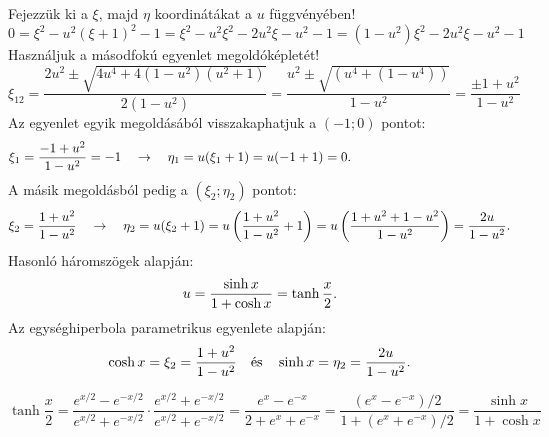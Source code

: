 \documentclass[a4paper, 12pt]{scrartcl}
\begin{document}
\begin{learnMore}
  Fejezzük ki a $\xi$, majd $\eta$ koordinátákat a $u$ függvényében!
  \[
    0
    = \xi^2 - u^2(\xi + 1)^2 - 1
    = \xi^2 - u^2\xi^2 - 2u^2\xi - u^2 - 1
    = (1 - u^2)\xi^2 - 2u^2\xi - u^2 - 1
  \]
  Használjuk a másodfokú egyenlet megoldóképletét!
  \[
    \xi_{12} = \frac{
      2u^2 \pm \sqrt{4u^4 + 4(1 - u^2)(u^2 + 1)}
    }{
      2(1 - u^2)
    } = \frac{
      u^2 \pm \sqrt{(u^4 + (1 - u^4))}
    }{
      1 - u^2
    } = \frac{
      \pm 1 + u^2
    }{
      1 - u^2
    }
  \]
  Az egyenlet egyik megoldásából visszakaphatjuk a $(-1;0)$ pontot:
  \[
    \xi_1 = \frac{-1 + u^2}{1 - u^2} = -1
    \quad \rightarrow \quad
    \eta_1 = u(\xi_1 + 1) = u(-1 + 1) = 0
    \text.
    \hspace{43mm}
  \]
  A másik megoldásból pedig a $(\xi_2; \eta_2)$ pontot:
  \[
    \xi_2 = \frac{1 + u^2}{1 - u^2}
    \quad \rightarrow \quad
    \eta_2 = u(\xi_2 + 1) = u\left(
    \frac{1 + u^2}{1 - u^2} + 1
    \right) = u\left(
    \frac{1 + u^2 + 1 - u^2}{1 - u^2}
    \right) = \frac{2u}{1 - u^2}
    \text.
  \]
  Hasonló háromszögek alapján:
  \[
    u
    = \frac{\sinh x}{1 + \cosh x}
    = \tanh \frac{x}{2}
    \text.
  \]
  Az egységhiperbola parametrikus egyenlete alapján:
  \[
    \cosh x = \xi_2 = \frac{1 + u^2}{1 - u^2}
    \quad \text{és} \quad
    \sinh x = \eta_2 = \frac{2u}{1 - u^2}
    \text.
  \]
\end{learnMore}

\begin{note}
  \[
    \tanh \frac{x}{2}
    = \frac{e^{x/2} - e^{-x/2}}{e^{x/2} + e^{-x/2}}
    \cdot \frac{e^{x/2} + e^{-x/2}}{e^{x/2} + e^{-x/2}}
    = \frac{e^x - e^{-x}}{2 + e^x + e^{-x}}
    = \frac{(e^x - e^{-x})/2}{1 + (e^x + e^{-x})/2}
    = \frac{\sinh x}{1 + \cosh x}
  \]
\end{note}
\end{document}
